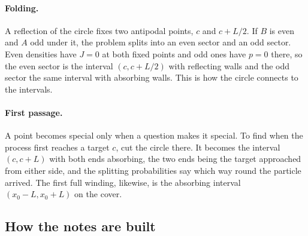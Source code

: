 \documentclass[11pt]{article}
\numberwithin{equation}{section}
\begin{document}
\paragraph{Folding.} A reflection of the circle fixes two antipodal points, $c$ and $c+L/2$. If $B$ is even and
$A$ odd under it, the problem splits into an even sector and an odd sector. Even densities have $J=0$ at both
fixed points and odd ones have $p=0$ there, so the even sector is the interval $(c,c+L/2)$ with reflecting
walls and the odd sector the same interval with absorbing walls. This is how the circle connects to the
intervals.

\paragraph{First passage.} A point becomes special only when a question makes it special. To find when the
process first reaches a target $c$, cut the circle there. It becomes the interval $(c,c+L)$ with both ends
absorbing, the two ends being the target approached from either side, and the splitting probabilities say
which way round the particle arrived. The first full winding, likewise, is the absorbing interval
$(x_0-L,x_0+L)$ on the cover.

\subsection{How the notes are built}
\label{sec:roadmap}
\end{document}
